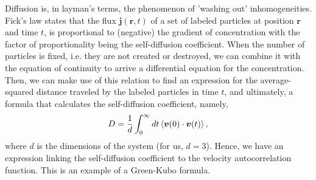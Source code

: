 \documentclass[11pt]{article}
\begin{document}
Diffusion is, in layman's terms, the phenomenon of 'washing out' inhomogeneities. Fick's law states that the flux $\bm{j}(\bm{r},t)$ of a set of labeled particles at position $\bm{r}$ and time $t$, is proportional to (negative) the gradient of concentration with the factor of proportionality being the self-diffusion coefficient. When the number of particles is fixed, i.e. they are not created or destroyed, we can combine it with the equation of continuity to arrive a differential equation for the concentration. Then, we can make use of this relation to find an expression for the average-squared distance traveled by the labeled particles in time $t$, and ultimately, a formula that calculates the self-diffusion coefficient, namely,
\begin{align}
	D=\frac1d\int_0^\infty dt\braket{\bm{v}(0)\cdot\bm{v}(t)},
\end{align}
where $d$ is the dimensions of the system (for us, $d=3$). Hence, we have an expression linking the self-diffusion coefficient to the velocity autocorrelation function. This is an example of a Green-Kubo formula.
\end{document}
